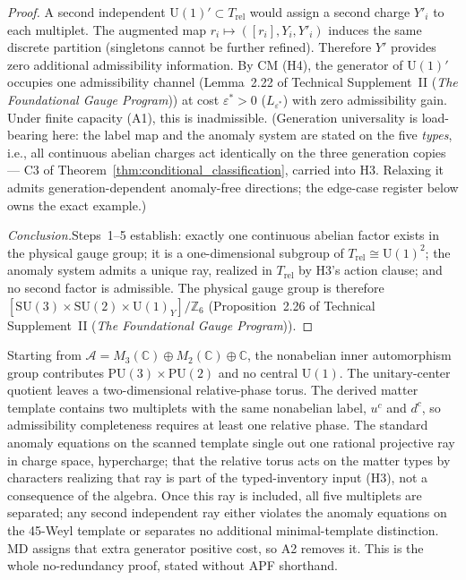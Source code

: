 \documentclass[11pt]{article}
\theoremstyle{definition}
\newcommand{\SU}{\mathrm{SU}}
\newcommand{\U}{\mathrm{U}}
\newcommand{\TSII}{Technical Supplement~II (\emph{The Foundational Gauge Program})}
\begin{document}
\begin{proof}
A second independent $\U(1)' \subset T_{\mathrm{rel}}$ would assign
a second charge $Y'_i$ to each multiplet.  The augmented map
$r_i \mapsto ([r_i], Y_i, Y'_i)$ induces the same discrete
partition (singletons cannot be further refined).  Therefore $Y'$
provides zero additional admissibility information.  By CM (H4), the
generator of $\U(1)'$ occupies one admissibility channel
(Lemma~2.22 of \TSII{}) at cost $\varepsilon^* > 0$
($L_{\varepsilon^*}$) with zero admissibility gain.  Under finite
capacity (A1), this is inadmissible.  (Generation universality is
load-bearing here: the label map and the anomaly system are stated on
the five \emph{types}, i.e., all continuous abelian charges act
identically on the three generation copies --- C3 of
Theorem~\ref{thm:conditional_classification}, carried into H3.
Relaxing it admits generation-dependent anomaly-free directions; the
edge-case register below owns the exact example.)

\textit{Conclusion.}\quad Steps~1--5 establish: exactly one
continuous abelian factor exists in the physical gauge group; it is a
one-dimensional subgroup of $T_{\mathrm{rel}} \cong \mathrm{U}(1)^2$;
the anomaly system admits a unique ray, realized in
$T_{\mathrm{rel}}$ by H3's action clause; and no second factor is
admissible.  The physical gauge group is therefore
$[\SU(3) \times \SU(2) \times \U(1)_Y] / \mathbb{Z}_6$
(Proposition~2.26 of \TSII{}).
\end{proof}

\begin{tcolorbox}[apfbox, title={Unique $\U(1)$ proof in conventional language}]
\footnotesize
Starting from $\mathcal A=M_3(\mathbb C)\oplus M_2(\mathbb C)\oplus\mathbb C$, the nonabelian inner automorphism group contributes $\mathrm{PU}(3)\times\mathrm{PU}(2)$ and no central $\U(1)$.  The unitary-center quotient leaves a two-dimensional relative-phase torus.  The derived matter template contains two multiplets with the same nonabelian label, $u^c$ and $d^c$, so admissibility completeness requires at least one relative phase.  The standard anomaly equations on the scanned template single out one rational projective ray in charge space, hypercharge; that the relative torus acts on the matter types by characters realizing that ray is part of the typed-inventory input (H3), not a consequence of the algebra.  Once this ray is included, all five multiplets are separated; any second independent ray either violates the anomaly equations on the 45-Weyl template or separates no additional minimal-template distinction.  MD assigns that extra generator positive cost, so A2 removes it.  This is the whole no-redundancy proof, stated without APF shorthand.
\end{tcolorbox}
\end{document}
